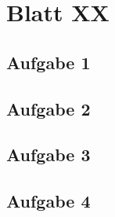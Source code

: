 \chapter{Blatt XX} %
\section{Aufgabe 1}
\section{Aufgabe 2}
\section{Aufgabe 3}
\section{Aufgabe 4}
